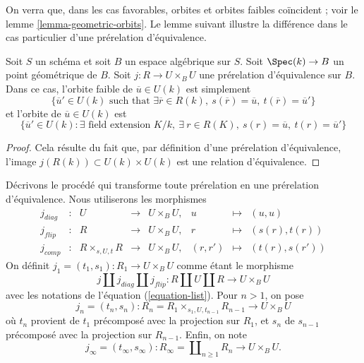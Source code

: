 \noindent
On verra que, dans les cas favorables, orbites et orbites faibles coïncident ; voir
le lemme \ref{lemma-geometric-orbits}. Le lemme suivant illustre
la différence dans le cas particulier d'une prérelation d'équivalence.

\begin{lemma}
\label{lemma-weak-orbit-pre-equivalence}
Soit $S$ un schéma et soit $B$ un espace algébrique sur $S$.
Soit $\Spec(k) \to B$ un point géométrique de $B$.
Soit $j : R \to U \times_B U$ une prérelation d'équivalence sur $B$.
Dans ce cas, l'orbite faible de $\overline{u} \in U(k)$ est simplement
$$
\{
\overline{u}' \in U(k)
\text{ such that }
\exists \overline{r} \in R(k),
\ s(\overline{r}) = \overline{u},
\ t(\overline{r}) = \overline{u}'
\}
$$
et l'orbite de $\overline{u} \in U(k)$ est
$$
\{
\overline{u}' \in U(k) :
\exists\text{ field extension }K/k, \ \exists\ r \in R(K),
\ s(r) = \overline{u}, \ t(r) = \overline{u}'\}
$$
\end{lemma}

\begin{proof}
Cela résulte du fait que, par définition d'une prérelation d'équivalence, l'image
$j(R(k)) \subset U(k) \times U(k)$ est une relation d'équivalence.
\end{proof}

\noindent
Décrivons le procédé qui transforme toute prérelation en une
prérelation d'équivalence. Nous utiliserons les morphismes
\begin{equation}
\label{equation-list}
\begin{matrix}
j_{diag} &
: &
U &
\longrightarrow &
U \times_B U, &
u &
\longmapsto &
(u, u) \\
j_{flip} &
: &
R &
\longrightarrow &
U \times_B U, &
r &
\longmapsto &
(s(r), t(r)) \\
j_{comp} &
: &
R \times_{s, U, t} R &
\longrightarrow &
U \times_B U, &
(r, r') &
\longmapsto &
(t(r), s(r'))
\end{matrix}
\end{equation}
On définit $j_1 = (t_1, s_1) : R_1 \to U \times_B U$ comme étant le morphisme
$$
j \amalg j_{diag} \amalg j_{flip} :
R \amalg U \amalg R
\longrightarrow
U \times_B U
$$
avec les notations de
l'équation (\ref{equation-list}).
Pour $n > 1$, on pose
$$
j_n = (t_n, s_n) :
R_n = R_1 \times_{s_1, U, t_{n - 1}} R_{n - 1} \longrightarrow U \times_B U
$$
où $t_n$ provient de $t_1$ précomposé avec la projection sur $R_1$, et
$s_n$ de $s_{n - 1}$ précomposé avec la projection sur $R_{n - 1}$.
Enfin, on note
$$
j_\infty = (t_\infty, s_\infty) :
R_\infty = \coprod\nolimits_{n \geq 1} R_n
\longrightarrow
U \times_B U.
$$

